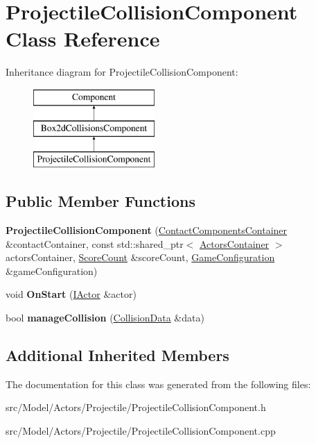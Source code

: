 \hypertarget{classProjectileCollisionComponent}{}\section{Projectile\+Collision\+Component Class Reference}
\label{classProjectileCollisionComponent}
Inheritance diagram for Projectile\+Collision\+Component\+:\begin{figure}[H]
\begin{center}
\leavevmode
\includegraphics[height=3.000000cm]{classProjectileCollisionComponent}
\end{center}
\end{figure}
\subsection*{Public Member Functions}
\begin{DoxyCompactItemize}
\item 
{\bfseries Projectile\+Collision\+Component} (\hyperlink{classContactComponentsContainer}{Contact\+Components\+Container} \&contact\+Container, const std\+::shared\+\_\+ptr$<$ \hyperlink{classActorsContainer}{Actors\+Container} $>$ actors\+Container, \hyperlink{classScoreCount}{Score\+Count} \&score\+Count, \hyperlink{classGameConfiguration}{Game\+Configuration} \&game\+Configuration)\hypertarget{classProjectileCollisionComponent_a396bbecb213ca05576361a0fc2671ab8}{}\label{classProjectileCollisionComponent_a396bbecb213ca05576361a0fc2671ab8}

\item 
void {\bfseries On\+Start} (\hyperlink{classIActor}{I\+Actor} \&actor)\hypertarget{classProjectileCollisionComponent_a61b671a342b869fb41e70b7bdb42e729}{}\label{classProjectileCollisionComponent_a61b671a342b869fb41e70b7bdb42e729}

\item 
bool {\bfseries manage\+Collision} (\hyperlink{structCollisionData}{Collision\+Data} \&data)\hypertarget{classProjectileCollisionComponent_a4cd271549ceb8b83393e796fdc90d3ae}{}\label{classProjectileCollisionComponent_a4cd271549ceb8b83393e796fdc90d3ae}

\end{DoxyCompactItemize}
\subsection*{Additional Inherited Members}


The documentation for this class was generated from the following files\+:\begin{DoxyCompactItemize}
\item 
src/\+Model/\+Actors/\+Projectile/Projectile\+Collision\+Component.\+h\item 
src/\+Model/\+Actors/\+Projectile/Projectile\+Collision\+Component.\+cpp\end{DoxyCompactItemize}
